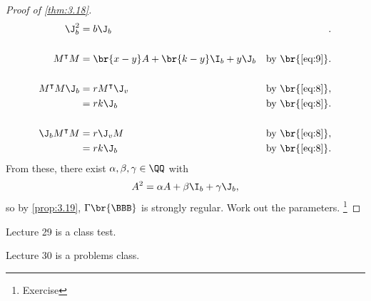 \begin{proof}[Proof of \ref{thm:3.18}]
\begin{align*}
\J_b^2
& = b\J_b & . \\
\\
M^\intercal M
& = \br{x - y}A + \br{k - y}\I_b + y\J_b & \text{by} \ \br{\ref{eq:9}}. \\
\\
M^\intercal M\J_b
& = rM^\intercal \J_v & \text{by} \ \br{\ref{eq:8}}, \\
& = rk\J_b & \text{by} \ \br{\ref{eq:8}}. \\
\\
\J_bM^\intercal M
& = r\J_vM & \text{by} \ \br{\ref{eq:8}}, \\
& = rk\J_b & \text{by} \ \br{\ref{eq:8}}.
\end{align*}
From these, there exist $ \alpha, \beta, \gamma \in \QQ $ with
$$ A^2 = \alpha A + \beta\I_b + \gamma\J_b, $$
so by \ref{prop:3.19}, $ \Gamma\br{\BBB} $ is strongly regular. Work out the parameters. \footnote{Exercise}
\end{proof}


Lecture 29 is a class test.


Lecture 30 is a problems class.

